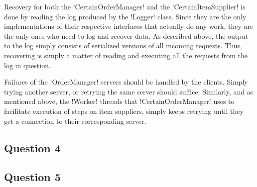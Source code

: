 \documentclass[a4paper, 12pt]{article}
\begin{document}

Recovery for both the !CertainOrderManager! and the
!CertainItemSupplier! is done by reading the log produced by the
!Logger! class. Since they are the only implementations of their
respective interfaces that actually do any work, they are the only
ones who need to log and recover data. As described above, the output
to the log simply consists of serialized versions of all incoming
requests. Thus, recovering is simply a matter of reading and executing
all the requests from the log in question.

Failures of the !OrderManager! servers should be handled by the
clients. Simply trying another server, or retrying the same server
should suffice. Similarly, and as mentioned above, the !Worker!
threads that !CertainOrderManager! uses to facilitate execution of
steps on item suppliers, simply keeps retrying until they get a
connection to their corresponding server.


\subsection*{Question 4}






\subsection*{Question 5}

\end{document}
